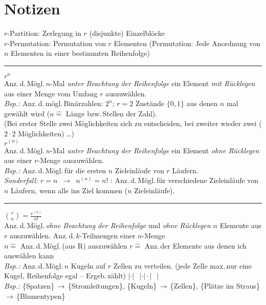 \documentclass[a4paper,10pt,titlepage]{scrartcl}
\begin{document}
\newpage

\section*{Notizen}
\label{sec:notizen}
\noindent
$r$-Partition: Zerlegung in $r$ (disjunkte) Einzelblöcke\\
$r$-Permutation: Permutation von $r$ Elementen \; (Permutation: Jede Anordnung von $n$ Elementen in einer bestimmten Reihenfolge)\\
\noindent\rule[2pt]{20.2cm}{0.1mm}

$r^n$\\
Anz.\,d.\,Mögl.\,$n$-Mal \emph{unter Beachtung der Reihenfolge} ein Element \emph{mit Rücklegen} aus einer Menge vom Umfang $r$ auszuwählen.\\
\emph{Bsp.:} Anz.\,d.\,mögl.\,Binärzahlen: $2^n$; $r=2$ Zustände $\{0,1\}$ aus denen $n$ mal gewählt wird ($n\mathrel{\widehat{=}}$ Länge bzw.\,Stellen der Zahl).\\
(Bei erster Stelle zwei Möglichkeiten sich zu entscheiden, bei zweiter wieder zwei ($2\cdot2$ Möglichkeiten) \dots)\\

$r^{(n)}$ \\
Anz.\,d.\,Mögl.\,$n$-Mal \emph{unter Beachtung der Reihenfolge} ein Element \emph{ohne Rücklegen} aus einer $r$-Menge auszuwählen.\\
\emph{Bsp.:} Anz.\,d.\,Mögl.\,für die ersten $n$ Zieleinläufe von $r$ Läufern.\\
\emph{Sonderfall:} $r=n$ $\,\to\,$ $n^{(n)}=n!$ : Anz.\,d.\,Mögl.\,für verschiedene Zieleinläufe von $n$ Läufern, wenn alle ins Ziel kommen ($n$ Zieleinläufe).
\noindent\rule[3pt]{20.2cm}{0.1mm}

$\binom{r}{n}=\frac{r^{(n)}}{n!}$  \\
Anz.\,d.\,Mögl.\,\emph{ohne Beachtung der Reihenfolge} und \emph{ohne Rücklegen} $n$ Elemente aus $r$ auszuwählen. {\fontsize{8pt}{0pt}\selectfont Anz.\,d.\,$k$-Teilmengen einer $n$-Menge}\\
$n \mathrel{\widehat{=}}$ Anz.\,d.\,Mögl.\,(aus R) auszuwählen \quad $r \mathrel{\widehat{=}}$ Anz.\,der Elemente aus denen ich auswählen kann\\
\emph{Bsp.:} Anz.\,d.\,Mögl.\,$n$ Kugeln auf $r$ Zellen zu verteilen. (jede Zelle max.\,nur eine Kugel, Reihenfolge egal -- Ergeb.\,zählt) \; $|\cdot|\;\;\,|\cdot|\cdot|\;\;\,|$\\
\emph{Bsp.:} \{Spatzen\}\,$\to$\,\{Stromleitungen\}, \{Kugeln\}\,$\to$\,\{Zellen\}, \{Plätze im Straus\}\,$\to$\,\{Blumentypen\}\\
\end{document}

